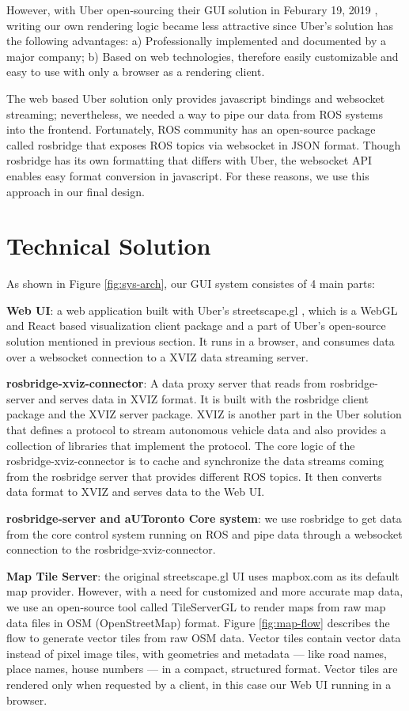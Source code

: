 \documentclass{article}
\begin{document}
However, with Uber open-sourcing their GUI solution in Feburary 19, 2019 \cite{ubernews}, writing our own rendering logic became less attractive since Uber's solution has the following advantages: a) Professionally implemented and documented by a major company; b) Based on web technologies, therefore easily customizable and easy to use with only a browser as a rendering client.

The web based Uber solution only provides javascript bindings and websocket streaming; nevertheless, we needed a way to pipe our data from ROS systems into the frontend. Fortunately, ROS community has an open-source package called rosbridge \cite{rosbridge} that exposes ROS topics via websocket in JSON format. Though rosbridge has its own formatting that differs with Uber, the websocket API enables easy format conversion in javascript. For these reasons, we use this approach in our final design.

\section{Technical Solution}

As shown in Figure \ref{fig:sys-arch}, our GUI system consistes of 4 main parts:

\textbf{Web UI}: a web application built with Uber's streetscape.gl \cite{streetscapegl}, which is a WebGL and React based visualization client package and a part of Uber's open-source solution mentioned in previous section. It runs in a browser, and consumes data over a websocket connection to a XVIZ data streaming server. 

\textbf{rosbridge-xviz-connector}: A data proxy server that reads from rosbridge-server and serves data in XVIZ format. It is built with the rosbridge client package and the XVIZ server package. XVIZ is another part in the Uber solution that defines a protocol to stream autonomous vehicle data and also provides a collection of libraries that implement the protocol. The core logic of the rosbridge-xviz-connector is to cache and synchronize the data streams coming from the rosbridge server that provides different ROS topics. It then converts data format to XVIZ and serves data to the Web UI.

\textbf{rosbridge-server and aUToronto Core system}: we use rosbridge to get data from the core control system running on ROS and pipe data through a websocket connection to the rosbridge-xviz-connector.

\textbf{Map Tile Server}: the original streetscape.gl UI uses mapbox.com as its default map provider. However, with a need for customized and more accurate map data, we use an open-source tool called TileServerGL \cite{vectortile1} to render maps from raw map data files in OSM (OpenStreetMap) format. Figure \ref{fig:map-flow} describes the flow to generate vector tiles from raw OSM data. Vector tiles contain vector data instead of pixel image tiles, with geometries and metadata — like road names, place names, house numbers — in a compact, structured format. Vector tiles are rendered only when requested by a client, in this case our Web UI running in a browser. 
\end{document}
